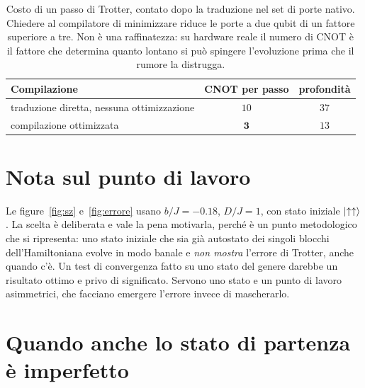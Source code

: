 \documentclass[11pt,a4paper]{article}
\begin{document}
\begin{table}[htbp]
\centering
\small
\renewcommand{\arraystretch}{1.3}
\begin{tabular}{@{}lcc@{}}
\toprule
\rowcolor{grigetto}
\textbf{Compilazione} & \textbf{CNOT per passo} & \textbf{profondità} \\
\midrule
traduzione diretta, nessuna ottimizzazione & $10$ & $37$ \\
compilazione ottimizzata & $\mathbf{3}$ & $13$ \\
\bottomrule
\end{tabular}
\caption{Costo di un passo di Trotter, contato dopo la traduzione nel set di
porte nativo. Chiedere al compilatore di minimizzare riduce le porte a due
qubit di un fattore superiore a tre. Non è una raffinatezza: su hardware reale
il numero di CNOT è il fattore che determina quanto lontano si può spingere
l'evoluzione prima che il rumore la distrugga.}
\end{table}

\FloatBarrier


\section{Nota sul punto di lavoro}

Le figure~\ref{fig:sz} e~\ref{fig:errore} usano $b/J=-0.18$, $D/J=1$, con stato
iniziale $\lvert \uparrow\uparrow\rangle$. La scelta è deliberata e vale la pena
motivarla, perché è un punto metodologico che si ripresenta: uno stato iniziale
che sia già autostato dei singoli blocchi dell'Hamiltoniana evolve in modo
banale e \emph{non mostra} l'errore di Trotter, anche quando c'è. Un test di
convergenza fatto su uno stato del genere darebbe un risultato ottimo e privo di
significato. Servono uno stato e un punto di lavoro asimmetrici, che facciano
emergere l'errore invece di mascherarlo.

\section{Quando anche lo stato di partenza è imperfetto}
\end{document}
